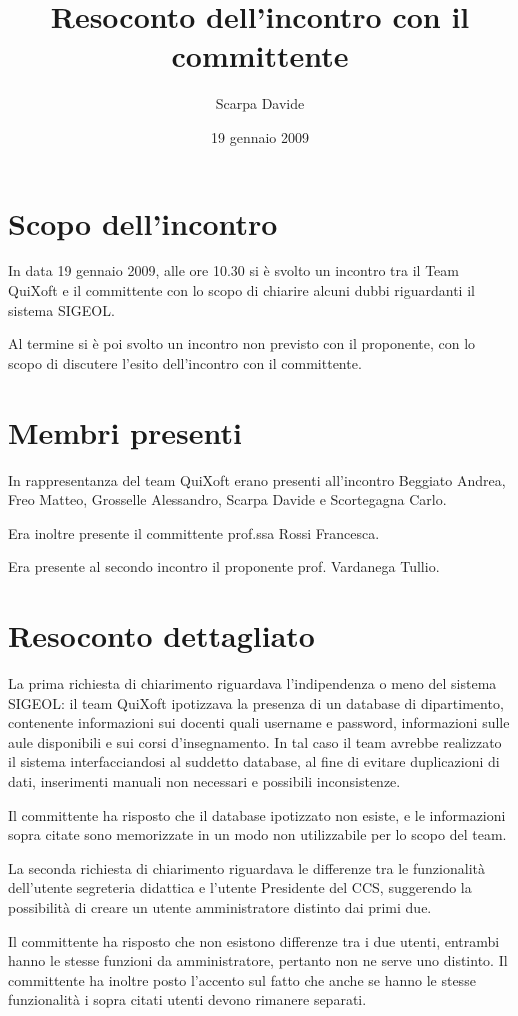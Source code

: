\documentclass[11pt,a4paper]{article}
\title{Resoconto dell'incontro con il committente}
\author{Scarpa Davide}
\date{19 gennaio 2009}
\begin{document}
\maketitle
\section{Scopo dell'incontro}
In data 19 gennaio 2009, alle ore 10.30 si è svolto un incontro tra il Team QuiXoft e il committente con lo scopo di chiarire alcuni dubbi riguardanti il sistema SIGEOL.

Al termine si è poi svolto un incontro non previsto con il proponente, con lo scopo di discutere l'esito dell'incontro con il committente.
\section{Membri presenti}
In rappresentanza del team QuiXoft erano presenti all'incontro Beggiato Andrea, Freo Matteo, Grosselle Alessandro, Scarpa Davide e Scortegagna Carlo.

Era inoltre presente il committente prof.ssa Rossi Francesca.

Era presente al secondo incontro il proponente prof. Vardanega Tullio.
\section{Resoconto dettagliato}
La prima richiesta di chiarimento riguardava l'indipendenza o meno del sistema SIGEOL: il team QuiXoft ipotizzava la presenza di un database di dipartimento, contenente informazioni sui docenti quali username e password, informazioni sulle aule disponibili e sui corsi d'insegnamento. In tal caso il team avrebbe realizzato il sistema interfacciandosi al suddetto database, al fine di evitare duplicazioni di dati, inserimenti manuali non necessari e possibili inconsistenze.

Il committente ha risposto che il database ipotizzato non esiste, e le informazioni sopra citate sono memorizzate in un modo non utilizzabile per lo scopo del team.

La seconda richiesta di chiarimento riguardava le differenze tra le funzionalità dell'utente segreteria didattica e l'utente Presidente del CCS, suggerendo la possibilità di creare un utente amministratore distinto dai primi due.

Il committente ha risposto che non esistono differenze tra i due utenti, entrambi hanno le stesse funzioni da amministratore, pertanto non ne serve uno distinto.
Il committente ha inoltre posto l'accento sul fatto che anche se hanno le stesse funzionalità i sopra citati utenti devono rimanere separati.
\end{document}
